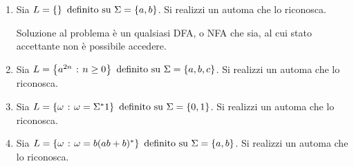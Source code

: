 \documentclass{subfiles}
\begin{document}
\begin{enumerate}
    \item Sia \(L = \Set{} \text{definito su} \Sigma = \Set{a, b}\). Si realizzi un automa che lo riconosca.
          

          \begin{Note*}
              Soluzione al problema è un qualsiasi DFA, o NFA che sia, al cui stato accettante non è possibile accedere.
          \end{Note*}

    \item Sia \(L = \set{a^{2n}}{n \ge 0} \text{definito su} \Sigma = \Set{a, b, c}\). Si realizzi un automa che lo riconosca.
          

    \item Sia \(L = \set{\omega}{\omega = \Sigma^{*}1} \text{definito su} \Sigma = \Set{0, 1}\). Si realizzi un automa che lo riconosca.
          

    \item Sia \(L = \set{\omega}{\omega = b (ab + b)^{*}} \text{definito su} \Sigma = \Set{a, b}\). Si realizzi un automa che lo riconosca.
          
\end{enumerate}
\clearpage
\end{document}
